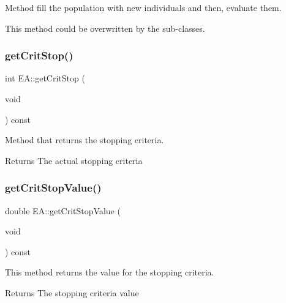 Method fill the population with new individuals and then, evaluate them. 

This method could be overwritten by the sub-\/classes. \mbox{\label{classEA_a6ec89c4b5edec15a2c59f8f640522169}} 
\subsubsection{\texorpdfstring{get\+Crit\+Stop()}{getCritStop()}}
{\footnotesize\ttfamily int E\+A\+::get\+Crit\+Stop (\begin{DoxyParamCaption}\item[{void}]{ }\end{DoxyParamCaption}) const\hspace{0.3cm}{\ttfamily [inline]}}



Method that returns the stopping criteria. 

\begin{DoxyReturn}{Returns}
The actual stopping criteria 
\end{DoxyReturn}
\mbox{\label{classEA_a53c6bb76e024220eae10799b732d1571}} 
\subsubsection{\texorpdfstring{get\+Crit\+Stop\+Value()}{getCritStopValue()}}
{\footnotesize\ttfamily double E\+A\+::get\+Crit\+Stop\+Value (\begin{DoxyParamCaption}\item[{void}]{ }\end{DoxyParamCaption}) const\hspace{0.3cm}{\ttfamily [inline]}}



This method returns the value for the stopping criteria. 

\begin{DoxyReturn}{Returns}
The stopping criteria value 
\end{DoxyReturn}
\mbox{\label{classEA_ad2ab19a63b1222c13f67009ac2df972d}} 
